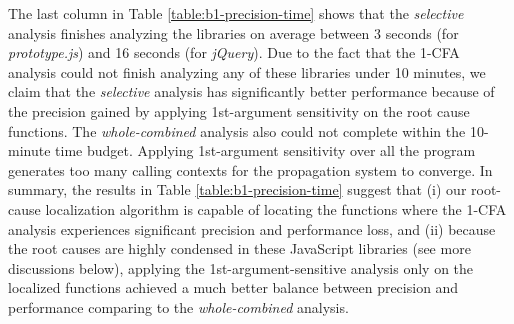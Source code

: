 The last column in Table \ref{table:b1-precision-time} shows that the {\it selective} analysis finishes analyzing the libraries on average between 3 seconds (for {\it prototype.js}) and 16 seconds (for {\it jQuery}). Due to the fact that the 1-CFA analysis could not finish analyzing any of these libraries under 10 minutes, we claim that the {\it selective} analysis has significantly better performance because of the precision gained by applying 1st-argument sensitivity on the root cause functions. The {\it whole-combined} analysis also could not complete within the 10-minute time budget. Applying 1st-argument sensitivity over all the program generates too many calling contexts for the propagation system to converge. In summary, the results in Table \ref{table:b1-precision-time} suggest that (i) our root-cause localization algorithm is capable of locating the functions where the 1-CFA analysis experiences significant precision and performance loss, and (ii) because the root causes are highly condensed in these JavaScript libraries (see more discussions below), applying the 1st-argument-sensitive analysis only on the localized functions achieved a much better balance between precision and performance comparing to the {\it whole-combined} analysis.


